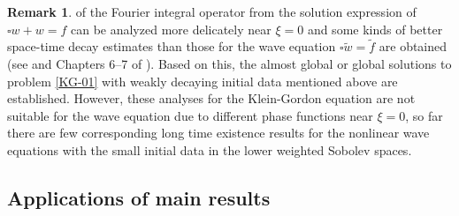 \documentclass[11pt,twoside]{article}
\theoremstyle{plain}
\theoremstyle{definition}
\newtheorem{remark}{Remark}[section]
\numberwithin{equation}{section}
\begin{document}
\begin{remark}
of the Fourier integral operator from the solution expression of $\square w+w=f$ can be analyzed more delicately  near $\xi=0$
and some kinds of better space-time decay estimates than those for the wave equation $\square\tilde w=\tilde f$ are obtained (see \cite{DengPusateri,Zheng1,Zheng2,HouYin2,HouTaoYin} and Chapters 6--7 of \cite{Hormander}). Based on this, the almost global or global solutions to problem \eqref{KG-01} with weakly decaying initial data
mentioned above are established. However, these analyses for the Klein-Gordon equation are not suitable for
the wave equation due to different phase functions near $\xi=0$,
so far there are few corresponding long time existence results for the nonlinear wave equations with the small initial data
in the lower weighted Sobolev spaces.
\end{remark}	





\subsection{Applications of main results}
\end{document}
